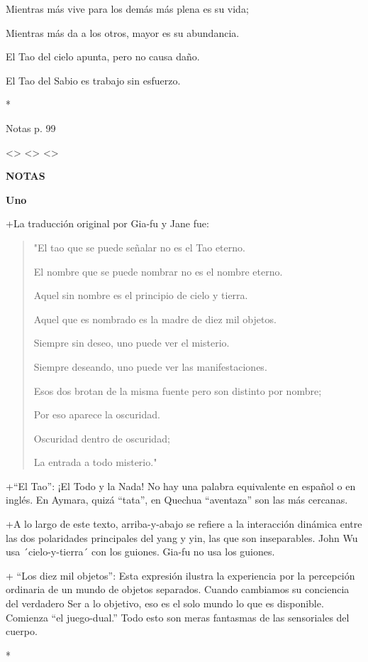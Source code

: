 Mientras más vive para los demás más plena es su vida;

Mientras más da a los otros, mayor es su abundancia.

El Tao del cielo apunta, pero no causa daño.

El Tao del Sabio es trabajo sin esfuerzo.

*

Notas p. 99

\textless\textgreater{} \textless\textgreater{} \textless\textgreater{}

\textbf{{NOTAS}}

\textbf{Uno}

+La traducción original por Gia-fu y Jane fue:

\begin{quote}
"El tao que se puede señalar no es el Tao eterno.

El nombre que se puede nombrar no es el nombre eterno.

Aquel sin nombre es el principio de cielo y tierra.

Aquel que es nombrado es la madre de diez mil objetos.

Siempre sin deseo, uno puede ver el misterio.

Siempre deseando, uno puede ver las manifestaciones.

Esos dos brotan de la misma fuente pero son distinto por nombre;

Por eso aparece la oscuridad.

Oscuridad dentro de oscuridad;

La entrada a todo misterio."
\end{quote}

+``El Tao'': ¡El Todo y la Nada! No hay una palabra equivalente en
español o en inglés. En Aymara, quizá ``tata'', en Quechua ``aventaza''
son las más cercanas.

+A lo largo de este texto, arriba-y-abajo se refiere a la interacción
dinámica entre las dos polaridades principales del yang y yin, las que
son inseparables. John Wu usa ´cielo-y-tierra´ con los guiones. Gia-fu
no usa los guiones.

+ ``Los diez mil objetos'': Esta expresión ilustra la experiencia por la
percepción ordinaria de un mundo de objetos separados. Cuando cambiamos
su conciencia del verdadero Ser a lo objetivo, eso es el solo mundo lo
que es disponible. Comienza ``el juego-dual.'' Todo esto son meras
fantasmas de las sensoriales del cuerpo.

*

